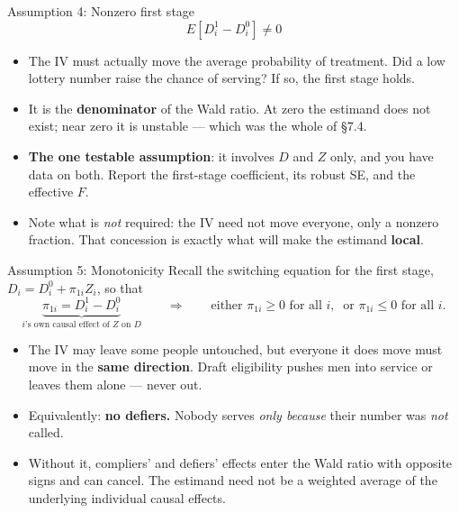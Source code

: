 \documentclass[
  11pt,
  ignorenonframetext,
  aspectratio=169,
]{beamer}
\providecommand{\tightlist}{%
  \setlength{\itemsep}{0pt}\setlength{\parskip}{0pt}}
\begin{document}
\begin{frame}{Assumption 4: Nonzero first stage}
\protect{}\label{assumption-4-nonzero-first-stage}
\[E[D^1_i - D^0_i] \neq 0\]

\begin{itemize}
\tightlist
\item
  The IV must actually move the average probability of treatment. Did a
  low lottery number raise the chance of serving? If so, the first stage
  holds.
\item
  It is the \textbf{denominator} of the Wald ratio. At zero the estimand
  does not exist; near zero it is unstable --- which was the whole of
  §7.4.
\item
  \textbf{The one testable assumption}: it involves \(D\) and \(Z\)
  only, and you have data on both. Report the first-stage coefficient,
  its robust SE, and the effective \(F\).
\item
  Note what is \emph{not} required: the IV need not move everyone, only
  a nonzero fraction. That concession is exactly what will make the
  estimand \textbf{local}.
\end{itemize}
\end{frame}

\begin{frame}{Assumption 5: Monotonicity}
\protect{}\label{assumption-5-monotonicity}
Recall the switching equation for the first stage,
\(D_i = D_i^{0} + \pi_{1i} Z_i\), so that
\[\underbrace{\pi_{1i} = D^1_i - D^0_i}_{i\text{'s own causal effect of } Z \text{ on } D}
\qquad\Longrightarrow\qquad
\text{either } \pi_{1i} \geq 0 \text{ for all } i, \ \text{ or } \pi_{1i} \leq 0 \text{ for all } i .\]

\begin{itemize}
\tightlist
\item
  The IV may leave some people untouched, but everyone it does move must
  move in the \textbf{same direction}. Draft eligibility pushes men into
  service or leaves them alone --- never out.
\item
  Equivalently: \textbf{no defiers.} Nobody serves \emph{only because}
  their number was \emph{not} called.
\item
  Without it, compliers' and defiers' effects enter the Wald ratio with
  opposite signs and can cancel. The estimand need not be a weighted
  average of the underlying individual causal effects.
\end{itemize}
\end{frame}
\end{document}
